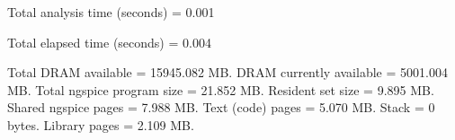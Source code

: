 Total analysis time (seconds) = 0.001

Total elapsed time (seconds) = 0.004 

Total DRAM available = 15945.082 MB.
DRAM currently available = 5001.004 MB.
Total ngspice program size =   21.852 MB.
Resident set size =    9.895 MB.
Shared ngspice pages =    7.988 MB.
Text (code) pages =    5.070 MB.
Stack = 0 bytes.
Library pages =    2.109 MB.

